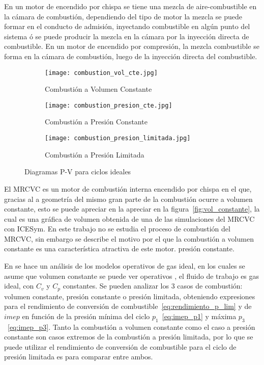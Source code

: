 En un motor de encendido por chispa se tiene una mezcla de aire-combustible en
la cámara de combustión, dependiendo del tipo de motor la mezcla se puede formar
en el conducto de admisión, inyectando combustible en algún punto del sistema ó
se puede producir la mezcla en la cámara por la inyección directa de
combustible.
%
En un motor de encendido por compresión, la mezcla combustible se forma en la
cámara de combustión, luego de la inyección directa del combustible.

\begin{figure}
  \centering
  \begin{subfigure}{0.33\textwidth}
    \centering
    \texttt{[image: combustion\_vol\_cte.jpg]}
    \caption{Combustión a Volumen Constante}
  \end{subfigure}%
  \begin{subfigure}{0.33\textwidth}
    \centering
    \texttt{[image: combustion\_presion\_cte.jpg]}
    \caption{Combustión a Presión Constante}
  \end{subfigure}%
  \begin{subfigure}{0.4\textwidth}
    \centering
    \texttt{[image: combustion\_presion\_limitada.jpg]}
    \caption{Combustión a Presión Limitada}
  \end{subfigure}
  \caption{Diagramas P-V para ciclos ideales\parencite{heywood}}\label{fig:ciclos_ideales}
\end{figure}

El MRCVC es un motor de combustión interna encendido por chispa en el que,
gracias al a geometría del mismo gran parte de la combustión ocurre a volumen
constante, esto se puede apreciar en la apreciar en la
figura~\ref{fig:vol_constante}, la cual es una gráfica de volumen obtenida de
una de las simulaciones del MRCVC con ICESym.
%
En este trabajo no se estudia el proceso de combustión del MRCVC, sin embargo se
describe el motivo por el que la combustión a volumen constante es una
característica atractiva de este motor.  %
presión constante.

En \parencite{heywood} se hace un análisis de los modelos operativos de gas
ideal, en los cuales se asume que %
volumen constante se puede ver %
operativos \parencite{heywood}, el fluido de trabajo es gas ideal, con $C_v$ y
$C_p$ constantes.
%
Se pueden analizar los 3 casos de combustión: volumen constante, presión
constante o presión limitada, obteniendo expresiones para el rendimiento de
conversión de combustible~\ref{eq:rendimiento_p_lim} y de $imep$ en función de
la presión mínima del ciclo $p_1$~\ref{eq:imep_p1} y máxima
$p_3$~\ref{eq:imep_p3}.
%
Tanto la combustión a volumen constante como el caso a presión constante son
casos extremos de la combustión a presión limitada, por lo que se puede utilizar
el rendimiento de conversión de combustible para el ciclo de presión limitada es
para comparar entre ambos.

